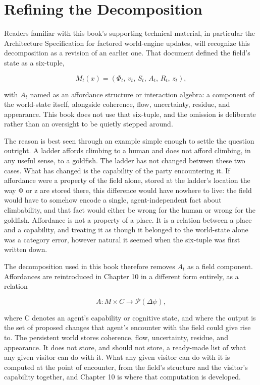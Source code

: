 \section{Refining the Decomposition}

Readers familiar with this book's supporting technical material, in particular the Architecture Specification for factored world-engine updates, will recognize this decomposition as a revision of an earlier one. That document defined the field's state as a six-tuple,

\[ M_t(x) = (\Phi_t,\, v_t,\, S_t,\, A_t,\, R_t,\, z_t), \]

with \(A_t\) named as an affordance structure or interaction algebra: a component of the world-state itself, alongside coherence, flow, uncertainty, residue, and appearance. This book does not use that six-tuple, and the omission is deliberate rather than an oversight to be quietly stepped around.

The reason is best seen through an example simple enough to settle the question outright. A ladder affords climbing to a human and does not afford climbing, in any useful sense, to a goldfish. The ladder has not changed between these two cases. What has changed is the capability of the party encountering it. If affordance were a property of the field alone, stored at the ladder's location the way Φ or z are stored there, this difference would have nowhere to live: the field would have to somehow encode a single, agent-independent fact about climbability, and that fact would either be wrong for the human or wrong for the goldfish. Affordance is not a property of a place. It is a relation between a place and a capability, and treating it as though it belonged to the world-state alone was a category error, however natural it seemed when the six-tuple was first written down.

The decomposition used in this book therefore removes \(A_t\) as a field component. Affordances are reintroduced in Chapter 10 in a different form entirely, as a relation

\[ A : M \times C \to \mathcal{P}(\Delta\psi), \]

where C denotes an agent's capability or cognitive state, and where the output is the set of proposed changes that agent's encounter with the field could give rise to. The persistent world stores coherence, flow, uncertainty, residue, and appearance. It does not store, and should not store, a ready-made list of what any given visitor can do with it. What any given visitor can do with it is computed at the point of encounter, from the field's structure and the visitor's capability together, and Chapter 10 is where that computation is developed.

